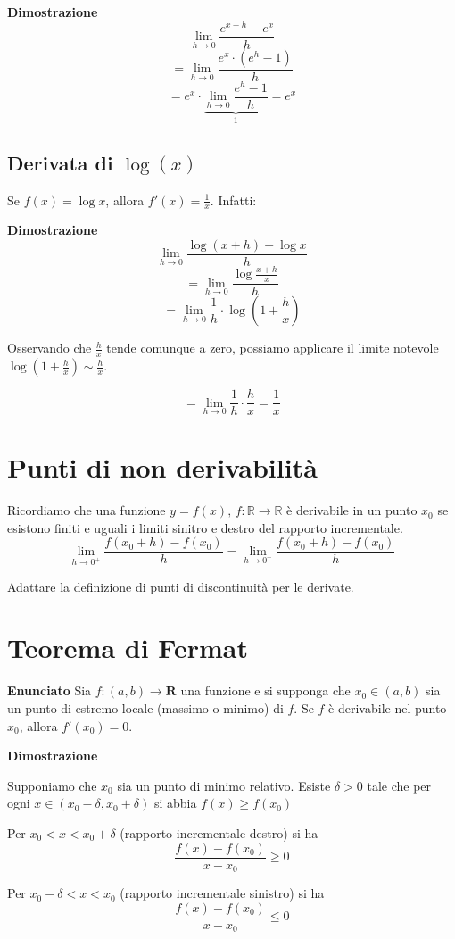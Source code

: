 \textbf{Dimostrazione}
$$
\lim_{h \to 0} \frac{e^{x+h} - e^x}{h} $$ $$
= \lim_{h \to 0} \frac{e^x \cdot (e^h - 1)}{h} $$ $$
= e^x \cdot \underbrace{\lim_{h \to 0} \frac{e^h - 1}{h}}_{1} = e^x
$$

\subsection{Derivata di $\log(x)$}
Se $f(x) = \log x$, allora $f'(x) = \frac{1}{x}$. Infatti:

\textbf{Dimostrazione}
$$\lim_{h \to 0} \frac{\log (x+h) - \log x}{h} $$ $$
= \lim_{h \to 0} \frac{\log \frac{x+h}{x}}{h} $$ $$
= \lim_{h \to 0} \frac{1}{h} \cdot \log \left(1 + \frac{h}{x} \right) $$

Osservando che $\frac{h}{x}$ tende comunque a zero, possiamo applicare il limite notevole $\log (1 + \frac{h}{x} ) \sim \frac{h}{x}$.

$$= \lim_{h \to 0} \frac{1}{h} \cdot \frac{h}{x} = \frac{1}{x}$$

\section{Punti di non derivabilità}

Ricordiamo che una funzione $y=f(x)\mbox{, }f:\mathbb{R}\to \mathbb{R}$ è derivabile in un punto $x_0$ se esistono finiti e uguali i limiti sinitro e destro del rapporto incrementale. $$\lim_{h\to 0^{+}}{\frac{f(x_0+h)-f(x_0)}{h}}=\lim_{h\to 0^{-}}{\frac{f(x_0+h)-f(x_0)}{h}}$$

Adattare la definizione di punti di discontinuità per le derivate.

\section{Teorema di Fermat}

\textbf{Enunciato}
Sia $f: (a,b)\to\textbf{R}$ una funzione e si supponga che $x_0 \in (a,b)$ sia un punto di estremo locale (massimo o minimo) di $f$. Se $f$ è derivabile nel punto $x_0$, allora $f'(x_0)=0$.

\textbf{Dimostrazione}

Supponiamo che $x_0$ sia un punto di minimo relativo. Esiste $\delta > 0$ tale che per ogni $x \in (x_0-\delta, x_0+\delta)$ si abbia $f(x)\geq f(x_0)$

Per $x_0<x<x_0+\delta$ (rapporto incrementale destro)  si ha $$ \frac{f(x)-f(x_0)}{x-x_0} \geq 0$$

Per $x_0-\delta<x<x_0$ (rapporto incrementale sinistro) si ha $$ \frac{f(x)-f(x_0)}{x-x_0} \leq 0$$

